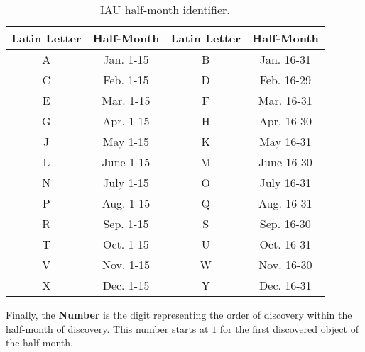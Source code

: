 \begin{table}[H]
    \centering
    \begin{tabular}{|c|c||c|c|}
        \hline
        \textbf{Latin Letter} & \textbf{Half-Month} & \textbf{Latin Letter} & \textbf{Half-Month} \\
        \hline
        A & Jan. 1-15 & B & Jan. 16-31 \\
        C & Feb. 1-15 & D & Feb. 16-29 \\
        E & Mar. 1-15 & F & Mar. 16-31 \\
        G & Apr. 1-15 & H & Apr. 16-30 \\
        J & May 1-15 & K & May 16-31 \\
        L & June 1-15 & M & June 16-30 \\
        N & July 1-15 & O & July 16-31 \\
        P & Aug. 1-15 & Q & Aug. 16-31 \\
        R & Sep. 1-15 & S & Sep. 16-30 \\
        T & Oct. 1-15 & U & Oct. 16-31 \\
        V & Nov. 1-15 & W & Nov. 16-30 \\
        X & Dec. 1-15 & Y & Dec. 16-31 \\
        \hline
    \end{tabular}
    \caption[IAU half-month identifier.]{IAU half-month identifier.}
    \label{tab:iau_half_month_id}
\end{table}

Finally, the \textbf{Number} is the digit representing the order of discovery
within the half-month of discovery. This number starts at $1$ for the first
discovered object of the half-month.
